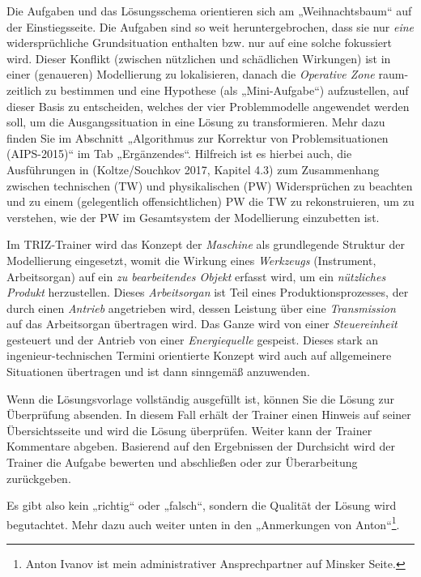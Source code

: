 \documentclass[11pt,a4paper]{article}
\begin{document}
Die Aufgaben und das Lösungsschema orientieren sich am „Weihnachtsbaum“ auf
der Einstiegsseite.  Die Aufgaben sind so weit heruntergebrochen, dass sie nur
\emph{eine} widersprüchliche Grundsituation enthalten bzw. nur auf eine solche
fokussiert wird.  Dieser Konflikt (zwischen nützlichen und schädlichen
Wirkungen) ist in einer (genaueren) Modellierung zu lokalisieren, danach die
\emph{Operative Zone} raum-zeitlich zu bestimmen und eine Hypothese (als
„Mini-Aufgabe“) aufzustellen, auf dieser Basis zu entscheiden, welches der
vier Problemmodelle angewendet werden soll, um die Ausgangssituation in eine
Lösung zu transformieren.  Mehr dazu finden Sie im Abschnitt „Algorithmus zur
Korrektur von Problemsituationen (AIPS-2015)“ im Tab „Ergänzendes“.  Hilfreich
ist es hierbei auch, die Ausführungen in (Koltze/Souchkov 2017, Kapitel 4.3)
zum Zusammenhang zwischen technischen (TW) und physikalischen (PW)
Widersprüchen zu beachten und zu einem (gelegentlich offensichtlichen) PW die
TW zu rekonstruieren, um zu verstehen, wie der PW im Gesamtsystem der
Modellierung einzubetten ist.
\enlargethispage{-1em}

Im TRIZ-Trainer wird das Konzept der \emph{Maschine} als grundlegende Struktur
der Modellierung eingesetzt, womit die Wirkung eines \emph{Werkzeugs}
(Instrument, Arbeitsorgan) auf ein \emph{zu bearbeitendes Objekt} erfasst
wird, um ein \emph{nützliches Produkt} herzustellen.  Dieses
\emph{Arbeitsorgan} ist Teil eines Produktionsprozesses, der durch einen
\emph{Antrieb} angetrieben wird, dessen Leistung über eine \emph{Transmission}
auf das Arbeitsorgan übertragen wird.  Das Ganze wird von einer
\emph{Steuereinheit} gesteuert und der Antrieb von einer \emph{Energiequelle}
gespeist.  Dieses stark an ingenieur-technischen Termini orientierte Konzept
wird auch auf allgemeinere Situationen übertragen und ist dann sinngemäß
anzuwenden.

Wenn die Lösungsvorlage vollständig ausgefüllt ist, können Sie die Lösung zur
Überprüfung absenden. In diesem Fall erhält der Trainer einen Hinweis auf
seiner Übersichtsseite und wird die Lösung überprüfen.  Weiter kann der
Trainer Kommentare abgeben. Basierend auf den Ergebnissen der Durchsicht wird
der Trainer die Aufgabe bewerten und abschließen oder zur Überarbeitung
zurückgeben.

Es gibt also kein „richtig“ oder „falsch“, sondern die Qualität der Lösung
wird begutachtet. Mehr dazu auch weiter unten in den „Anmerkungen von
Anton“\footnote{Anton Ivanov ist mein administrativer Ansprechpartner auf
  Minsker Seite.}.
\end{document}
